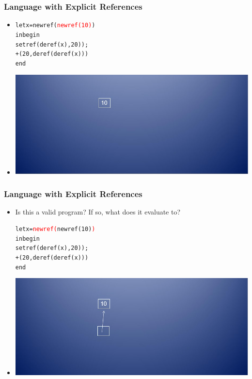 \documentclass{beamer}
\begin{document}
\begin{frame}[fragile]
\frametitle{Language with Explicit References}
\begin{scriptsize}
\begin{itemize}
\item<1->
\begin{alltt}
let x = newref(\textcolor{red}{newref(10)})
in begin
	setref(deref(x), 20));
	 +(20, deref(deref(x)))
   end
\end{alltt}

\item<1->
\begin{center}
\includegraphics[scale=0.5]{pointer-chain1.jpg}
\end{center}

\end{itemize}
\end{scriptsize}
\end{frame}

\begin{frame}[fragile]
\frametitle{Language with Explicit References}
\begin{scriptsize}
\begin{itemize}
\item<1-> Is this a valid program? If so, what does it evaluate to?
\begin{alltt}
let x = \textcolor{red}{newref(}newref(10)\textcolor{red}{)}
in begin
	setref(deref(x), 20));
	 +(20, deref(deref(x)))
   end
\end{alltt}

\item<1->
\begin{center}
\includegraphics[scale=0.5]{pointer-chain2.jpg}
\end{center}

\end{itemize}
\end{scriptsize}
\end{frame}
\end{document}
